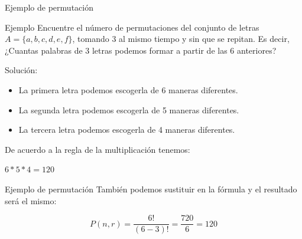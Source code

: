 \documentclass{beamer}
\begin{document}
\begin{frame}{Ejemplo de permutación} 
  \begin{exampleblock}{Ejemplo}
    Encuentre el número de permutaciones del conjunto de letras $A =
    \{a,b,c,d,e,f\}$, tomando 3 al mismo tiempo y sin que se repitan. Es decir,
    ¿Cuantas palabras de 3 letras podemos formar a partir de las 6 anteriores?
  \end{exampleblock}
  
  Solución:

  \begin{itemize}
    \item La primera letra podemos escogerla de 6 maneras diferentes.
    \item La segunda letra podemos escogerla de 5 maneras diferentes.
    \item La tercera letra podemos escogerla de 4 maneras diferentes.
  \end{itemize}
  De acuerdo a la regla de la multiplicación tenemos:
  \begin{exampleblock}{}
    \centering
    $6*5*4 = 120$
  \end{exampleblock}

\end{frame}

\begin{frame}{Ejemplo de permutación}
  También podemos sustituir en la fórmula y el resultado será el mismo:
  \begin{exampleblock}{}
    \begin{equation}
        P(n,r) =  \frac{6 !}{(6 - 3)!} = \frac{720}{6} = 120
    \end{equation}
  \end{exampleblock}
\end{frame}
\end{document}
